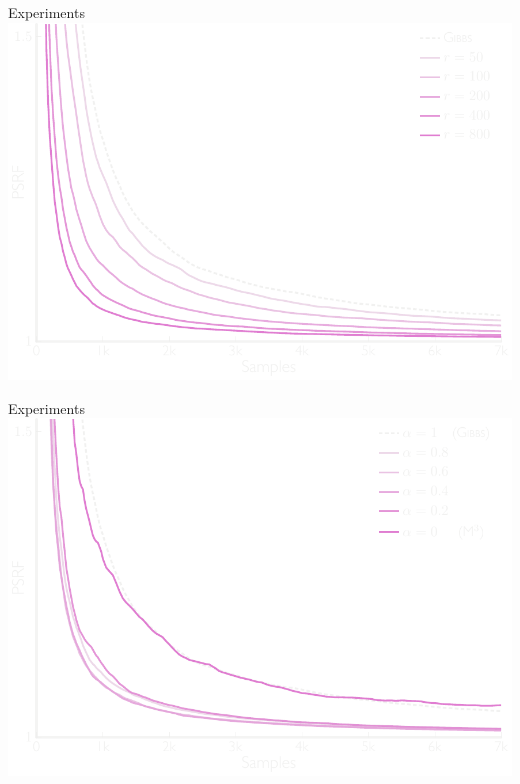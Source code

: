 \documentclass[mathserif]{beamer}
\begin{document}
\begin{frame}{Experiments}
\vspace{1em}
\centering
\includegraphics[width=\textwidth,trim=0 0 0 0,clip]{figures/exp2.pdf}
\end{frame}


\begin{frame}{Experiments}
\vspace{1em}
\centering
\includegraphics[width=\textwidth,trim=0 0 0 0,clip]{figures/exp3.pdf}
\end{frame}
\end{document}
